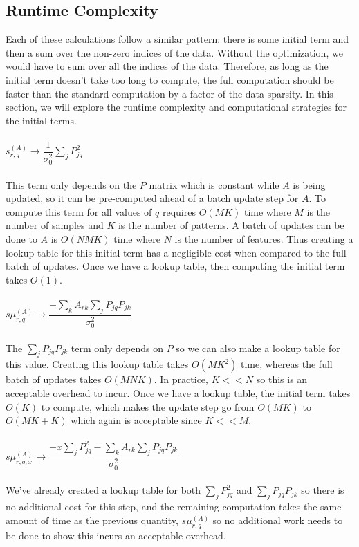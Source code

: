\documentclass[]{article}
\begin{document}
\subsection{Runtime Complexity}

Each of these calculations follow a similar pattern: there is some initial term and then a sum over the non-zero indices of the data. Without the optimization, we would have to sum over all the indices of the data. Therefore, as long as the initial term doesn't take too long to compute, the full computation should be faster than the standard computation by a factor of the data sparsity. In this section, we will explore the runtime complexity and computational strategies for the initial terms.\\
\\
$s^{(A)}_{r,q} \rightarrow \dfrac{1}{\sigma_0^2}\sum_j P_{jq}^2$\\
\\
This term only depends on the $P$ matrix which is constant while $A$ is being updated, so it can be pre-computed ahead of a batch update step for $A$. To compute this term for all values of $q$ requires $O(MK)$ time where $M$ is the number of samples and $K$ is the number of patterns. A batch of updates can be done to $A$ is $O(NMK)$ time where $N$ is the number of features. Thus creating a lookup table for this initial term has a negligible cost when compared to the full batch of updates. Once we have a lookup table, then computing the initial term takes $O(1)$.\\
\\
$s\mu^{(A)}_{r,q} \rightarrow \dfrac{-\sum_k A_{rk} \sum_j P_{jq} P_{jk}}{\sigma_0^2}$\\
\\
The $\sum_j P_{jq}P_{jk}$ term only depends on $P$ so we can also make a lookup table for this value. Creating this lookup table takes $O(MK^2)$ time, whereas the full batch of updates takes $O(MNK)$. In practice, $K << N$ so this is an acceptable overhead to incur. Once we have a lookup table, the initial term takes $O(K)$ to compute, which makes the update step go from $O(MK)$ to $O(MK + K)$ which again is acceptable since $K << M$.\\
\\
$s\mu_{r,q,x}^{(A)} \rightarrow \dfrac{-x\sum_j P_{jq}^2 - \sum_k A_{rk} \sum_j P_{jq} P_{jk}}{\sigma_0^2}$\\
\\
We've already created a lookup table for both $\sum_j P_{jq}^2$ and $\sum_j P_{jq}P_{jk}$ so there is no additional cost for this step, and the remaining computation takes the same amount of time as the previous quantity, $s\mu^{(A)}_{r,q}$ so no additional work needs to be done to show this incurs an acceptable overhead.\\
\end{document}
